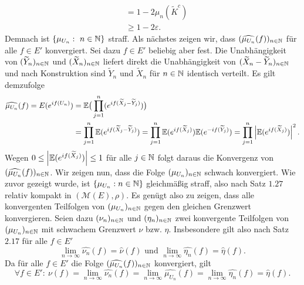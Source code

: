 \begin{proof*}
\begin{align*}
                                                              &= 1 - 2\mu_n(\tilde{K}^c) \\\
                                                              &\geq 1 - 2 \varepsilon.                                              
    \end{align*}
    Demnach ist $\{\mu_{U_n}: \ n \in \mathbb{N}\}$ straff. 
    Als nächstes zeigen wir, dass $(\widehat{\mu_{U_n}}(f))_{n \in \mathbb{N}}$ für alle $f \in E'$ konvergiert. Sei dazu $f \in E'$ beliebig aber fest. 
    Die Unabhängigkeit von $(\widetilde{Y}_n)_{n \in \mathbb{N}}$ und $(\widetilde{X}_n)_{n \in \mathbb{N}}$ liefert direkt die Unabhängigkeit von $(\widetilde{X}_n - \widetilde{Y}_n)_{n \in \mathbb{N}}$
    und nach Konstruktion sind $\tilde{Y}_n$ und $\tilde{X}_n$ für $n \in \mathbb{N}$ identisch verteilt. Es gilt demzufolge  
    \begin{align*}
        \widehat{\mu_{U_n}}(f) = E(e^{if(U_n)}) &= \mathbb{E}\big(\prod_{j=1}^n(e^{if(\widetilde{X}_j-\widetilde{Y}_j)})\big) \\\
                                                &= \prod_{j=1}^n \mathbb{E}(e^{if(\widetilde{X}_j-\widetilde{Y}_j)})
                                                 = \prod_{j=1}^n \mathbb{E}(e^{if(\widetilde{X}_j)})\mathbb{E}(e^{-if(\widetilde{Y}_j)})
                                                 = \prod_{j=1}^n \left| \mathbb{E}(e^{if(\widetilde{X}_j)}) \right|^2.
    \end{align*}
    Wegen $0 \leq \left| \mathbb{E}(e^{if(\widetilde{X}_j)}) \right| \leq 1$ für alle $j \in \mathbb{N}$ folgt daraus die Konvergenz von $(\widehat{\mu_{U_n}}(f))_{n \in \mathbb{N}}$. 
    Wir zeigen nun, dass die Folge $(\mu_{U_n})_{n \in \mathbb{N}}$ schwach konvergiert. 
    Wie zuvor gezeigt wurde, ist $\{\mu_{U_n}: n \in \mathbb{N}\}$ gleichmäßig straff, also nach Satz $1.27$ relativ kompakt in $(\mathcal{M}(E), \rho)$. 
    Es genügt also zu zeigen, dass alle konvergenten Teilfolgen von $(\mu_{U_n})_{n \in \mathbb{N}}$ gegen den gleichen Grenzwert konvergieren. 
    Seien dazu $(\nu_n)_{n \in \mathbb{N}}$ und $(\eta_n)_{n \in \mathbb{N}}$ zwei konvergente Teilfolgen von $(\mu_{U_n})_{n \in \mathbb{N}}$ mit schwachem Grenzwert $\nu$ bzw. $\eta$. 
    Insbesondere gilt also nach Satz $2.17$ für alle $f \in E'$
    $$
        \lim_{n \to \infty} \widehat{\nu_n}(f) = \widehat{\nu}(f) \text{ und } \lim_{n \to \infty} \widehat{\eta_n}(f) = \widehat{\eta}(f). 
    $$
    Da für alle $f \in E'$ die Folge $(\widehat{\mu_{U_n}}(f))_{n \in \mathbb{N}}$ konvergiert, gilt 
    $$
        \forall f \in E': \ \nu(f) = \lim_{n \to \infty} \widehat{\nu_n}(f) = \lim_{n \to \infty}\widehat{\mu_{U_n}}(f) = \lim_{n \to \infty}\widehat{\eta_n}(f) = \widehat{\eta}(f). 
$$
\end{proof*}
